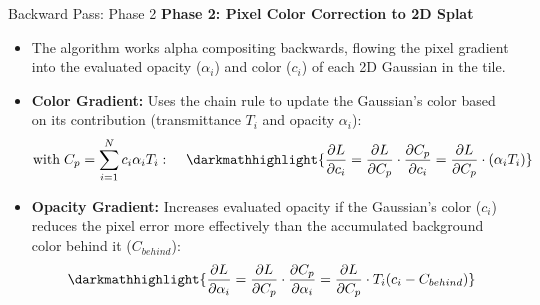 \begin{frame}{Backward Pass: Phase 2}
    \textbf{Phase 2: Pixel Color Correction to 2D Splat}
    \begin{itemize}
        \justifying
        \item The algorithm works alpha compositing backwards, flowing the pixel gradient into the evaluated opacity ($\alpha_i$) and color ($c_i$) of each 2D Gaussian in the tile.
    \end{itemize}

    \pause
    \vspace{0.5em}

    \begin{itemize}
        \justifying
        \item \textbf{Color Gradient:} Uses the chain rule to update the Gaussian's color based on its contribution (transmittance $T_i$ and opacity $\alpha_i$):
        $$ \text{with} \hspace{1mm} C_{p} = \sum_{i=1}^{N} c_i \alpha_i T_i: \hspace{4mm}
        \darkmathhighlight{
            \frac{\partial L}{\partial c_i} = 
            \frac{\partial L}{\partial C_p} \cdot \frac{\partial C_p}{\partial c_i} = 
            \frac{\partial L}{\partial C_p} \cdot (\alpha_i T_i)}  $$
    \end{itemize}

    \pause
    \vspace{0.5em}

    \begin{itemize}
        \justifying
        \item \textbf{Opacity Gradient:} Increases evaluated opacity if the Gaussian's color ($c_i$) reduces the pixel error more effectively than the accumulated background color behind it ($C_{behind}$):
        $$ \darkmathhighlight{
            \frac{\partial L}{\partial \alpha_i} = 
            \frac{\partial L}{\partial C_p} \cdot \frac{\partial C_p}{\partial \alpha_i} = 
            \frac{\partial L}{\partial C_p} \cdot T_i (c_i - C_{behind})} $$
    \end{itemize}
\end{frame}


